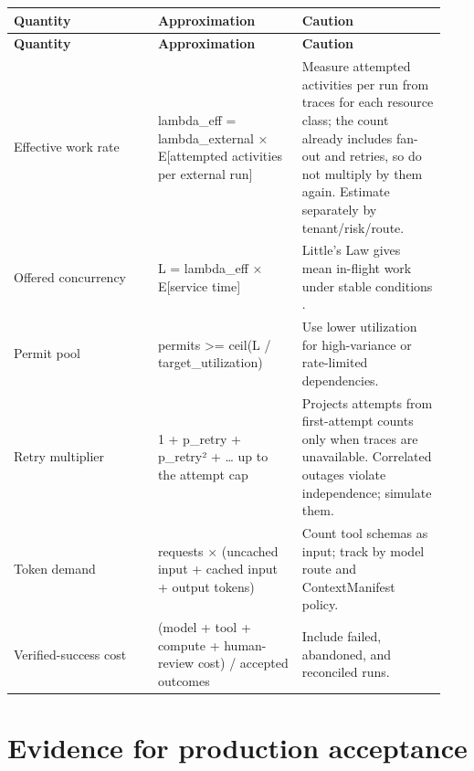 \BookTableStart
\small
\begin{longtable}{@{}Y{0.3133\linewidth}Y{0.3133\linewidth}Y{0.3133\linewidth}@{}}
\color{white}\bfseries \textbf{Quantity} & \color{white}\bfseries \textbf{Approximation} & \color{white}\bfseries \textbf{Caution} \\
\endfirsthead
{}
\color{white}\bfseries \textbf{Quantity} & \color{white}\bfseries \textbf{Approximation} & \color{white}\bfseries \textbf{Caution} \\
\endhead
Effective work rate & lambda\_eff = lambda\_external × E[attempted activities per external run] & Measure attempted activities per run from traces for each resource class; the count already includes fan-out and retries, so do not multiply by them again. Estimate separately by tenant/risk/route. \\
Offered concurrency & L = lambda\_eff × E[service time] & Little’s Law gives mean in-flight work under stable conditions . \\
Permit pool & permits >= ceil(L / target\_utilization) & Use lower utilization for high-variance or rate-limited dependencies. \\
Retry multiplier & 1 + p\_retry + p\_retry² + … up to the attempt cap & Projects attempts from first-attempt counts only when traces are unavailable. Correlated outages violate independence; simulate them. \\
Token demand & requests × (uncached input + cached input + output tokens) & Count tool schemas as input; track by model route and ContextManifest policy. \\
Verified-success cost & (model + tool + compute + human-review cost) / accepted outcomes & Include failed, abandoned, and reconciled runs. \\
\end{longtable}
\BookTableEnd

\section{Evidence for production acceptance}


